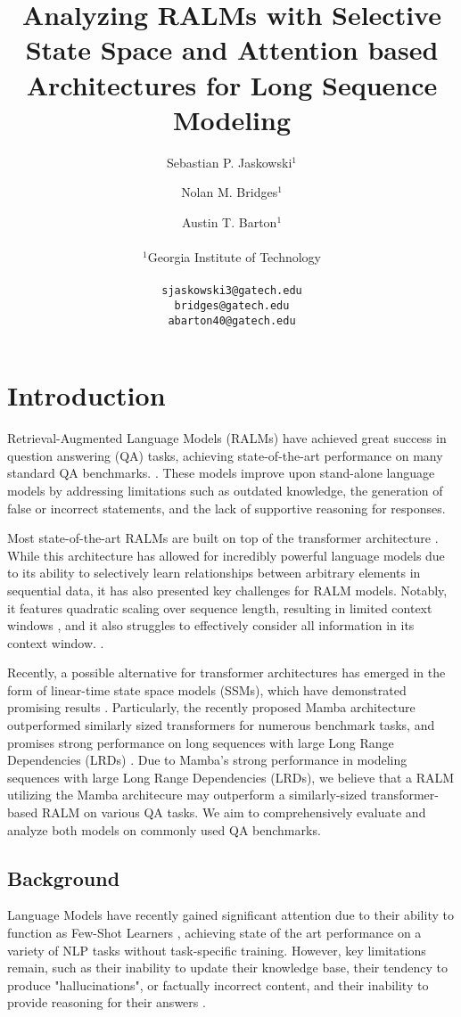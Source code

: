\documentclass[11pt]{article}
\title{Analyzing RALMs with Selective State Space and Attention based Architectures for Long Sequence Modeling}
\author{Sebastian P. Jaskowski$^1$ \and Nolan M. Bridges$^1$ \and Austin T. Barton$^1$ \\
        \\
         $^1$Georgia Institute of Technology \\ 
         \\ 
         \texttt{sjaskowski3@gatech.edu} \\ \texttt{bridges@gatech.edu} \\
         \texttt{abarton40@gatech.edu} \\}
\begin{document}
\maketitle

\section{Introduction}
Retrieval-Augmented Language Models (RALMs) have achieved great success in question answering (QA) tasks, achieving state-of-the-art performance on many standard QA benchmarks. \cite{lewis2021retrievalaugmented, gao2024retrievalaugmented}. These models improve upon stand-alone language models by addressing limitations such as outdated knowledge, the generation of false or incorrect statements, and the lack of supportive reasoning for responses. 

Most state-of-the-art RALMs are built on top of the transformer architecture \cite{vaswani2023attention}. While this architecture has allowed for incredibly powerful language models due to its ability to selectively learn relationships between arbitrary elements in sequential data, it has also presented key challenges for RALM models. Notably, it features quadratic scaling over sequence length, resulting in limited context windows \cite{xu2024retrieval}, and it also struggles to effectively consider all information in its context window. \cite{liu2023lost}.

Recently, a possible alternative for transformer architectures has emerged in the form of linear-time state space models (SSMs), which have demonstrated promising results \cite{gu2022, gu2021combining}. Particularly, the recently proposed Mamba architecture outperformed similarly sized transformers for numerous benchmark tasks, and promises strong performance on long sequences with large Long Range Dependencies (LRDs) \cite{gu2023mamba}. Due to Mamba's strong performance in modeling sequences with large Long Range Dependencies (LRDs), we believe that a RALM utilizing the Mamba architecure may outperform a similarly-sized transformer-based RALM on various QA tasks. We aim to comprehensively evaluate and analyze both models on commonly used QA benchmarks.
 
\subsection{Background}
Language Models have recently gained significant attention due to their ability to function as Few-Shot Learners \cite{brown2020language}, achieving state of the art performance on a variety of NLP tasks without task-specific training. However, key limitations remain, such as their inability to update their knowledge base, their tendency to produce "hallucinations", or factually incorrect content, and their inability to provide reasoning for their answers \cite{lewis2021retrievalaugmented, huang2023survey}. 
\end{document}
